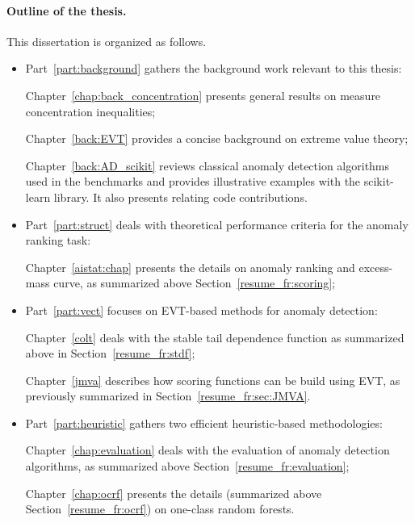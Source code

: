\paragraph{Outline of the thesis.}
This dissertation is organized as follows. 
\begin{itemize}
\item Part~\ref{part:background} gathers the background work relevant to this thesis:

Chapter~\ref{chap:back_concentration} presents general results on measure concentration inequalities; 

Chapter~\ref{back:EVT} provides a concise background on extreme value theory;

Chapter~\ref{back:AD_scikit} reviews classical anomaly detection algorithms used in the benchmarks and provides illustrative examples with the scikit-learn library. It also presents relating code contributions.

\item Part~\ref{part:struct} deals with theoretical performance criteria for the anomaly ranking task:

Chapter~\ref{aistat:chap} presents the details on anomaly ranking and excess-mass curve, as summarized above Section~\ref{resume_fr:scoring}; %

\item Part~\ref{part:vect} focuses on EVT-based methods for anomaly detection:

Chapter~\ref{colt} deals with the stable tail dependence function as summarized above in Section~\ref{resume_fr:stdf}; %

Chapter~\ref{jmva} describes how scoring functions can be build using EVT, as previously summarized in Section~\ref{resume_fr:sec:JMVA}.


\item Part~\ref{part:heuristic} gathers two efficient heuristic-based methodologies:

Chapter~\ref{chap:evaluation} deals with the evaluation of anomaly detection algorithms, as summarized above Section~\ref{resume_fr:evaluation}; %

Chapter~\ref{chap:ocrf} presents the details %
  (summarized above Section~\ref{resume_fr:ocrf}) on one-class random forests.


\end{itemize}
